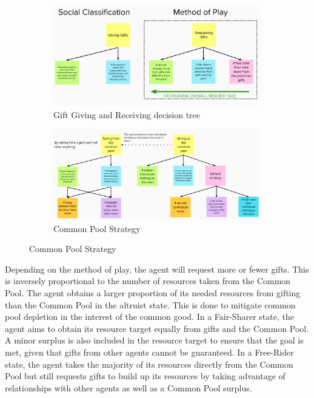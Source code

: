 \begin{figure}[!htb]
    \begin{subfigure}{.49\textwidth}
        \centering
        \includegraphics[width=0.99\textwidth]{images/gifts.png}
        \caption{Gift Giving and Receiving decision tree}
        \label{fig: gifts}
    \end{subfigure}
    \begin{subfigure}{.49\textwidth}
        \centering
        \includegraphics[width=0.99\textwidth]{images/common_pool_strategy.png}
        \caption{Common Pool Strategy}
        \label{fig: common_pool_strategy}        
    \end{subfigure}
\end{figure}

Depending on the method of play, the agent will request more or fewer gifts. This is inversely proportional to the number of resources taken from the Common Pool. The agent obtains a larger proportion of its needed resources from gifting than the Common Pool in the altruist state. This is done to mitigate common pool depletion in the interest of the common good. In a Fair-Sharer state, the agent aims to obtain its resource target equally from gifts and the Common Pool. A minor surplus is also included in the resource target to ensure that the goal is met, given that gifts from other agents cannot be guaranteed. In a Free-Rider state, the agent takes the majority of its resources directly from the Common Pool but still requests gifts to build up its resources by taking advantage of relationships with other agents as well as a Common Pool surplus.

